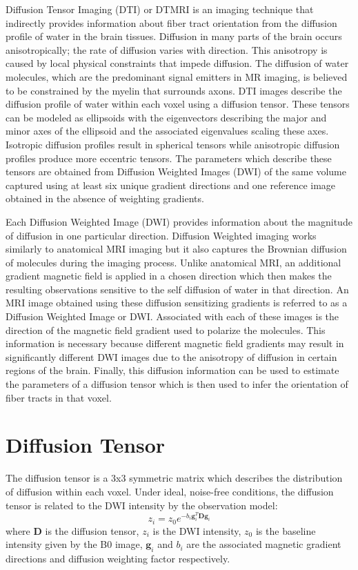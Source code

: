 Diffusion Tensor Imaging (DTI) or DTMRI is an imaging technique that indirectly provides information about fiber tract orientation from the diffusion profile of water in the brain tissues. Diffusion in many parts of the brain occurs anisotropically; the rate of diffusion varies with direction.  This anisotropy is caused by local physical constraints that impede diffusion.  The diffusion of water molecules, which are the predominant signal emitters in MR imaging, is believed to be constrained by the myelin that surrounds axons.  DTI images describe the diffusion profile of water within each voxel using a diffusion tensor.  These tensors can be modeled as ellipsoids with the eigenvectors describing the major and minor axes of the ellipsoid and the associated eigenvalues scaling these axes.  Isotropic diffusion profiles result in spherical tensors while anisotropic diffusion profiles produce more eccentric tensors.  The parameters which describe these tensors are obtained from Diffusion Weighted Images (DWI) of the same volume captured using at least six unique gradient directions and one reference image obtained in the absence of weighting gradients.

Each Diffusion Weighted Image (DWI) provides information about the magnitude of diffusion in one particular direction.  Diffusion Weighted imaging works similarly to anatomical MRI imaging but it also captures the Brownian diffusion of molecules during the imaging process.  Unlike anatomical MRI, an additional gradient magnetic field is applied in a chosen direction which then makes the resulting observations sensitive to the self diffusion of water in that direction. An MRI image obtained using these diffusion sensitizing gradients is referred to as a Diffusion Weighted Image or DWI.  Associated with each of these images is the direction of the magnetic field gradient used to polarize the molecules.  This information is necessary because different magnetic field gradients may result in significantly different DWI images due to the anisotropy of diffusion in certain regions of the brain.  Finally, this diffusion information can be used to estimate the parameters of a diffusion tensor which is then used to infer the orientation of fiber tracts in that voxel.

\section{Diffusion Tensor}
The diffusion tensor is a 3x3 symmetric matrix which describes the distribution of diffusion within each voxel.  Under ideal, noise-free conditions, the diffusion tensor is related to the DWI intensity by the observation model:
\begin{equation}
z_{i}=z_0 e^{-b_i \mathbf{g}_i^T \mathbf{D} \mathbf{g}_i}
\end{equation}
where $\mathbf{D}$ is the diffusion tensor, $z_i$ is the DWI intensity, $z_0$ is the baseline intensity given by the B0 image, $\mathbf{g}_i$ and $b_i$ are the associated magnetic gradient directions and diffusion weighting factor respectively.

